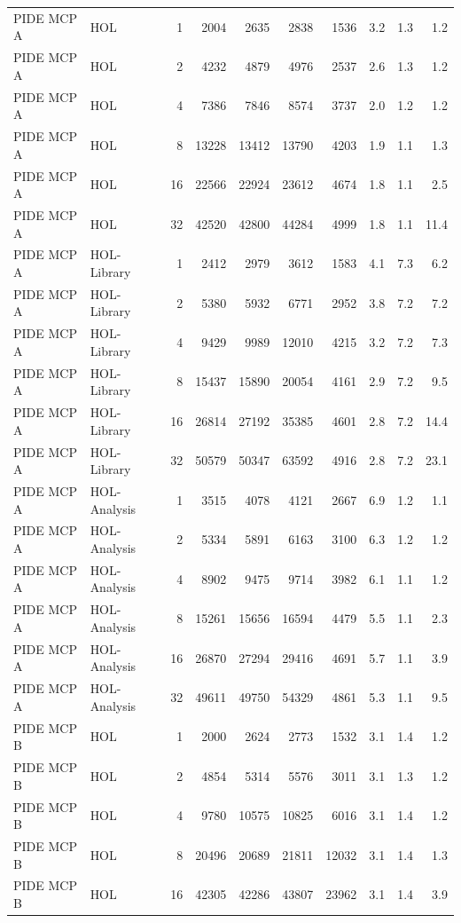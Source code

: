 \documentclass[11pt]{article}
\begin{document}
\begin{table}[p]
\begin{tabular}{@{}llrrrrrrrr@{}}
\midrule
PIDE MCP A & HOL & 1 & 2004 & 2635 & 2838 & 1536 & 3.2 & 1.3 & 1.2 \\
PIDE MCP A & HOL & 2 & 4232 & 4879 & 4976 & 2537 & 2.6 & 1.3 & 1.2 \\
PIDE MCP A & HOL & 4 & 7386 & 7846 & 8574 & 3737 & 2.0 & 1.2 & 1.2 \\
PIDE MCP A & HOL & 8 & 13228 & 13412 & 13790 & 4203 & 1.9 & 1.1 & 1.3 \\
PIDE MCP A & HOL & 16 & 22566 & 22924 & 23612 & 4674 & 1.8 & 1.1 & 2.5 \\
PIDE MCP A & HOL & 32 & 42520 & 42800 & 44284 & 4999 & 1.8 & 1.1 & 11.4 \\
PIDE MCP A & HOL-Library & 1 & 2412 & 2979 & 3612 & 1583 & 4.1 & 7.3 & 6.2 \\
PIDE MCP A & HOL-Library & 2 & 5380 & 5932 & 6771 & 2952 & 3.8 & 7.2 & 7.2 \\
PIDE MCP A & HOL-Library & 4 & 9429 & 9989 & 12010 & 4215 & 3.2 & 7.2 & 7.3 \\
PIDE MCP A & HOL-Library & 8 & 15437 & 15890 & 20054 & 4161 & 2.9 & 7.2 & 9.5 \\
PIDE MCP A & HOL-Library & 16 & 26814 & 27192 & 35385 & 4601 & 2.8 & 7.2 & 14.4 \\
PIDE MCP A & HOL-Library & 32 & 50579 & 50347 & 63592 & 4916 & 2.8 & 7.2 & 23.1 \\
PIDE MCP A & HOL-Analysis & 1 & 3515 & 4078 & 4121 & 2667 & 6.9 & 1.2 & 1.1 \\
PIDE MCP A & HOL-Analysis & 2 & 5334 & 5891 & 6163 & 3100 & 6.3 & 1.2 & 1.2 \\
PIDE MCP A & HOL-Analysis & 4 & 8902 & 9475 & 9714 & 3982 & 6.1 & 1.1 & 1.2 \\
PIDE MCP A & HOL-Analysis & 8 & 15261 & 15656 & 16594 & 4479 & 5.5 & 1.1 & 2.3 \\
PIDE MCP A & HOL-Analysis & 16 & 26870 & 27294 & 29416 & 4691 & 5.7 & 1.1 & 3.9 \\
PIDE MCP A & HOL-Analysis & 32 & 49611 & 49750 & 54329 & 4861 & 5.3 & 1.1 & 9.5 \\
\midrule
PIDE MCP B & HOL & 1 & 2000 & 2624 & 2773 & 1532 & 3.1 & 1.4 & 1.2 \\
PIDE MCP B & HOL & 2 & 4854 & 5314 & 5576 & 3011 & 3.1 & 1.3 & 1.2 \\
PIDE MCP B & HOL & 4 & 9780 & 10575 & 10825 & 6016 & 3.1 & 1.4 & 1.2 \\
PIDE MCP B & HOL & 8 & 20496 & 20689 & 21811 & 12032 & 3.1 & 1.4 & 1.3 \\
PIDE MCP B & HOL & 16 & 42305 & 42286 & 43807 & 23962 & 3.1 & 1.4 & 3.9 \\

\end{tabular}
\end{table}
\end{document}
